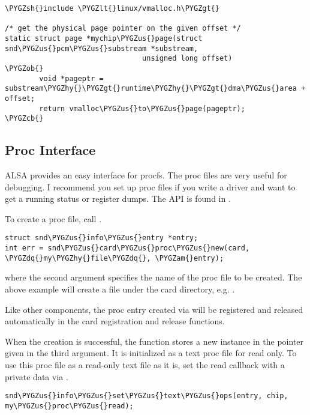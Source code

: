 \documentclass[a4paper,8pt,english]{sphinxmanual}
\def\PYGZus{\char`\_}
\def\PYGZob{\char`\{}
\def\PYGZcb{\char`\}}
\def\PYGZam{\char`\&}
\def\PYGZlt{\char`\<}
\def\PYGZgt{\char`\>}
\def\PYGZsh{\char`\#}
\def\PYGZhy{\char`\-}
\def\PYGZdq{\char`\"}
\begin{document}
\begin{Verbatim}[commandchars=\\\{\}]
\PYGZsh{}include \PYGZlt{}linux/vmalloc.h\PYGZgt{}

/* get the physical page pointer on the given offset */
static struct page *mychip\PYGZus{}page(struct snd\PYGZus{}pcm\PYGZus{}substream *substream,
                                unsigned long offset)
\PYGZob{}
        void *pageptr = substream\PYGZhy{}\PYGZgt{}runtime\PYGZhy{}\PYGZgt{}dma\PYGZus{}area + offset;
        return vmalloc\PYGZus{}to\PYGZus{}page(pageptr);
\PYGZcb{}
\end{Verbatim}


\subsection{Proc Interface}
\label{sound/kernel-api/writing-an-alsa-driver:proc-interface}
ALSA provides an easy interface for procfs. The proc files are very
useful for debugging. I recommend you set up proc files if you write a
driver and want to get a running status or register dumps. The API is
found in .

To create a proc file, call .

\begin{Verbatim}[commandchars=\\\{\}]
struct snd\PYGZus{}info\PYGZus{}entry *entry;
int err = snd\PYGZus{}card\PYGZus{}proc\PYGZus{}new(card, \PYGZdq{}my\PYGZhy{}file\PYGZdq{}, \PYGZam{}entry);
\end{Verbatim}

where the second argument specifies the name of the proc file to be
created. The above example will create a file  under the
card directory, e.g. .

Like other components, the proc entry created via
 will be registered and released
automatically in the card registration and release functions.

When the creation is successful, the function stores a new instance in
the pointer given in the third argument. It is initialized as a text
proc file for read only. To use this proc file as a read-only text file
as it is, set the read callback with a private data via
.

\begin{Verbatim}[commandchars=\\\{\}]
snd\PYGZus{}info\PYGZus{}set\PYGZus{}text\PYGZus{}ops(entry, chip, my\PYGZus{}proc\PYGZus{}read);
\end{Verbatim}
\end{document}
